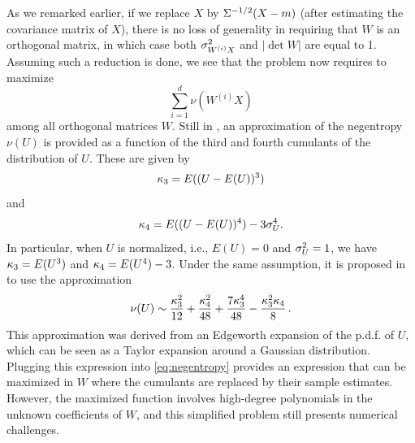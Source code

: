 As we remarked earlier, if we replace $X$ by $\Sigma^{-1/2} (X-m)$ (after estimating the covariance matrix of $X$), there is no loss of generality in requiring that $W$ is an orthogonal matrix, in which case both $\sigma_{W^{(i)}X}^2$ and $|\det W|$ are equal to 1. Assuming such a reduction is done, we see that the problem now requires to maximize
\begin{equation}
\label{eq:negentropy}
\sum_{i=1}^d \nu(W^{(i)}X)
\end{equation}
among all orthogonal matrices $W$. Still in \citet{comon1994independent}, an approximation of the negentropy $\nu(U)$ is provided as a function of the third and fourth cumulants of the distribution of $U$. These are given by
\[
\kappa_3 = E((U-E(U))^3)
\]
and
\[
\kappa_4 = E((U-E(U))^4) - 3\sigma_U^4.
\]
In particular, when $U$ is normalized, i.e.,  $E(U) = 0$ and $\sigma^2_U = 1$, we have $\kappa_3 = E(U^3)$ and $\kappa_4 = E(U^4) - 3$. Under the same assumption, it is proposed in \citet{comon1994independent} to use the approximation
\[
\nu(U) \sim \frac{\kappa_3^2}{12} + \frac{\kappa_4^2}{48} + \frac{7\kappa_3^4}{48} - \frac{\kappa_3^2\kappa_4}{8}\,.
\]
This approximation was derived from an Edgeworth expansion of the p.d.f. of $U$, which can be seen as a Taylor expansion around a Gaussian distribution. Plugging this expression into \cref{eq:negentropy} provides an expression that can be maximized in $W$ where the cumulants are replaced by their sample estimates. However, the maximized function involves high-degree polynomials in the unknown coefficients of $W$, and this simplified problem still presents numerical challenges. 

\bigskip

